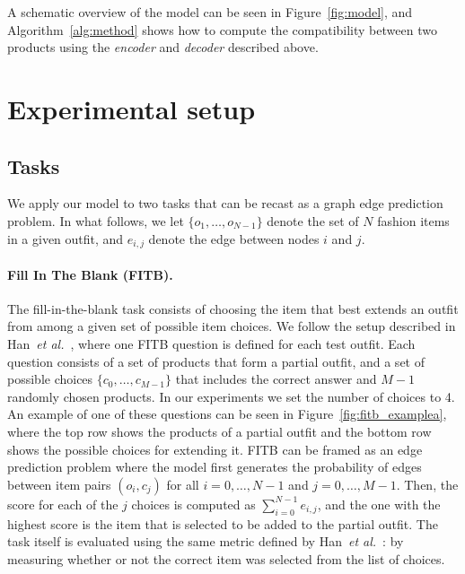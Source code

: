 \documentclass[10pt,twocolumn,letterpaper]{article}
\begin{document}
A schematic overview of the model can be seen in Figure~\ref{fig:model}, and Algorithm~\ref{alg:method} shows how to compute the compatibility between two products using the \emph{encoder} and \emph{decoder} described above.





\section{Experimental setup}
\label{sec:exp_setup}


\subsection{Tasks}
\label{ssec:tasks}
We apply our model to two tasks that can be recast as a graph edge prediction problem. In what follows, we let $\{o_1, \dotsc, o_{N-1}\}$ denote the set of $N$ fashion items in a given outfit, and $e_{i,j}$ denote the edge between nodes $i$ and $j$.


\paragraph{Fill In The Blank (FITB).}
\label{sssec:fitb}
The fill-in-the-blank task consists of choosing the item that best extends an outfit from among a given set of possible item choices. We follow the setup described in Han~\emph{et al.}~\cite{han2017learning}, where one FITB question is defined for each test outfit. Each question consists of a set of products that form a partial outfit, and a set of possible choices  $\{c_0, \dotsc, c_{M-1}\}$ that includes the correct answer and $M-1$ randomly chosen products. In our experiments we set the number of choices to 4. An example of one of these questions can be seen in Figure~\ref{fig:fitb_examplea}, where the top row shows the products of a partial outfit and the bottom row shows the possible choices for extending it. FITB can be framed as an edge prediction problem where the model first generates the probability of edges between item pairs $(o_i, c_j)$ for all $i=0,\dotsc, N-1$ and $j=0,\dotsc,M-1$. Then, the score for each of the $j$ choices is computed as $\sum_{i=0}^{N-1} e_{i,j}$, and the one with the highest score is the item that is selected to be added to the partial outfit. The task itself is evaluated using the same metric defined by Han~\emph{et al.}~\cite{han2017learning}: by measuring whether or not the correct item was selected from the list of choices.
\end{document}

